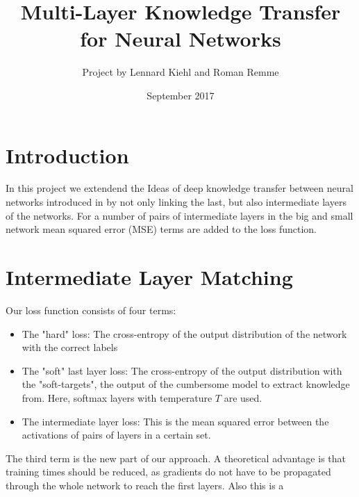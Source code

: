 \documentclass[]{scrartcl}
\title{Multi-Layer Knowledge Transfer for Neural Networks}
\author{Project by Lennard Kiehl and Roman Remme}
\date{September 2017}
\begin{document}
	

\maketitle

\tableofcontents
\newpage

\section{Introduction}
In this project we extendend the Ideas of deep knowledge transfer between neural networks introduced in \cite{hinton2015distilling} by not only linking the last, but also intermediate layers of the networks. For a number of pairs of intermediate layers in the big and small network mean squared error (MSE) terms are added to the loss function.

\section{Intermediate Layer Matching}

Our loss function consists of four terms:
\begin{itemize}
	\item The "hard" loss: The cross-entropy of the output distribution of the network with the correct labels
	\item The "soft" last layer loss: The cross-entropy of the output distribution with the "soft-targets", the output of the cumbersome model to extract knowledge from. Here, softmax layers with temperature $ T $ are used.
	\item The intermediate layer loss: This is the mean squared error between the activations of pairs of layers in a certain set.
\end{itemize}
The third term is the new part of our approach. A theoretical advantage is that training times should be reduced, as gradients do not have to be propagated through the whole network to reach the first layers. Also this is a 
\end{document}
